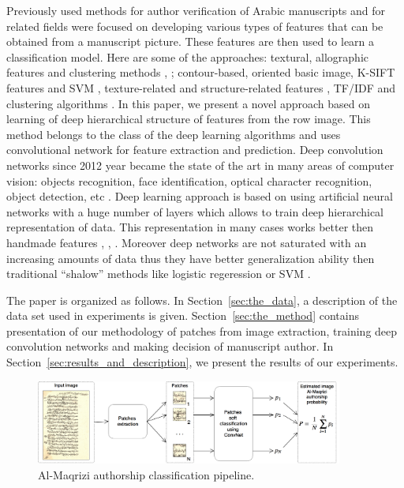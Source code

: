 \documentclass[a4paper,conference]{IEEEtran}
\begin{document}
Previously used methods for author verification of Arabic manuscripts and for related fields were focused on developing various types of features that can be obtained from a manuscript picture. These features are then used to learn a classification model. Here are some of the approaches: textural, allographic features and clustering methods \cite{MBulacu}, \cite{MBulacu1}; contour-based, oriented basic image, K-SIFT features and SVM \cite{DFecker}, texture-related and structure-related features \cite{Salvador}, TF/IDF and clustering algorithms \cite{Dunn}. In this paper, we present a novel approach based on learning of deep hierarchical structure of features from the row image. This method belongs to the class of the deep learning algorithms \cite{DL} and uses convolutional network \cite{CNN} for feature extraction and prediction. Deep convolution networks since 2012 year \cite{Alexnet} became the state of the art in many areas of computer vision: objects recognition, face identification, optical character recognition, object detection, etc \cite{DL}. Deep learning approach is based on using artificial neural networks with a huge number of layers which allows to train deep hierarchical representation of data. This representation in many cases works better then handmade features \cite{DL}, \cite{Alexnet}, \cite{Googlenet}. Moreover deep networks are not saturated with an increasing amounts of data thus they have better generalization ability then traditional ``shalow'' methods like logistic regeression or SVM \cite{DL}.   

The paper is organized as follows. In Section~\ref{sec:the_data}, a description of the data set used in experiments is given. Section~\ref{sec:the_method} contains presentation of our methodology of patches from image extraction, training deep convolution networks and making decision of manuscript author. In Section~\ref{sec:results_and_description}, we present the results of our experiments.

\begin{figure}[!t]
	\center
  \includegraphics[width=0.9\textwidth]{figures/Al-Maqrizi_classification_pipeline.png}
  \caption{Al-Maqrizi authorship classification pipeline.}
  \label{fig:pipeline}
\end{figure}	
	
\end{document}
